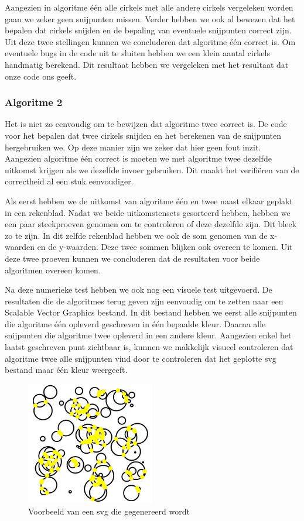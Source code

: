 \documentclass[11pt,a4paper]{article}
\begin{document}
Aangezien in algoritme \'e\'en alle cirkels met alle andere cirkels vergeleken worden gaan we zeker geen snijpunten missen. Verder hebben we ook al bewezen dat het bepalen dat cirkels snijden en de bepaling van eventuele snijpunten correct zijn. Uit deze twee stellingen kunnen we concluderen dat algoritme \'e\'en correct is.
Om eventuele bugs in de code uit te sluiten hebben we een klein aantal cirkels handmatig berekend. Dit resultaat hebben we vergeleken met het resultaat dat onze code ons geeft.

\subsubsection*{Algoritme 2}


Het is niet zo eenvoudig om te bewijzen dat algoritme twee correct is. De code voor het bepalen dat twee cirkels snijden en het berekenen van de snijpunten hergebruiken we. Op deze manier zijn we zeker dat hier geen fout inzit.
Aangezien algoritme \'e\'en correct is moeten we met algoritme twee dezelfde uitkomst krijgen als we dezelfde invoer gebruiken. Dit maakt het verifi\"eren van de correctheid al een stuk eenvoudiger.

Als eerst hebben we de uitkomst van algoritme \'e\'en en twee naast elkaar geplakt in een rekenblad. Nadat we beide uitkomstensets gesorteerd hebben, hebben we een paar steekproeven genomen om te controleren of deze dezelfde zijn. Dit bleek zo te zijn. In dit zelfde rekenblad hebben we ook de som genomen van de x-waarden en de y-waarden. Deze twee sommen blijken ook overeen te komen. Uit deze twee proeven kunnen we concluderen dat de resultaten voor beide algoritmen overeen komen.

Na deze numerieke test hebben we ook nog een visuele test uitgevoerd. De resultaten die de algoritmes terug geven zijn eenvoudig om te zetten naar een Scalable Vector Graphics bestand. In dit bestand hebben we eerst alle snijpunten die algoritme \'e\'en opleverd geschreven in \'e\'en bepaalde kleur. Daarna alle snijpunten die algoritme twee opleverd in een andere kleur. Aangezien enkel het laatst geschreven punt zichtbaar is, kunnen we makkelijk visueel controleren dat algoritme twee alle snijpunten vind door te controleren dat het geplotte svg bestand maar \'e\'en kleur weergeeft.

\begin{figure}[H]
\centering
\includegraphics[width=0.5\textwidth]{vb_svg.png}
\caption*{Voorbeeld van een svg die gegenereerd wordt}
\end{figure}
\end{document}
